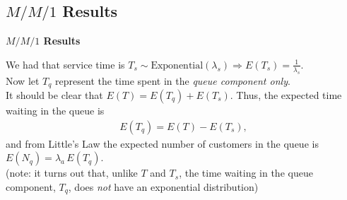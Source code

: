 \documentclass[compress]{beamer}        %
\makeatletter
\newcommand{\tcb}{\textcolor{beamer@blendedblue}}
\makeatother
\begin{document}
\subsection{$M / M / 1$ Results}
\begin{frame}{\bf \tcb{$M / M / 1$ Results}}

We had that service time is $T_s \sim \text{Exponential}(\lambda_s) \Rightarrow E(T_s) = \frac{1}{\lambda_s}$.\\[0.5cm]


Now let $T_q$ represent the time spent in the \emph{queue component only}.\\[0.5cm]


It should be clear that $E(T) = E(T_q) + E(T_s)$. Thus, the expected time waiting in the queue is
\begin{align*}
\boxed{E(T_q) = E(T) - E(T_s)},
\end{align*}
and from Little's Law the expected number of customers in the queue is $E(N_q) = \lambda_a \, E(T_q)$.\\[0.5cm]

{\footnotesize(note: it turns out that, unlike $T$ and $T_s$, the time waiting in the queue component, $T_q$, does \emph{not} have an exponential distribution)}

\end{frame}
\end{document}
